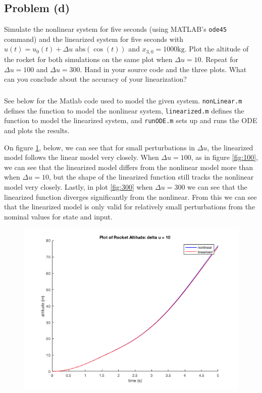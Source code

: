 \documentclass[11pt]{article}
\begin{document}
\subsection*{Problem (d)}
Simulate the nonlinear system for five seconds (using MATLAB's \texttt{ode45} command) and the linearized system for five seconds with $u(t)=u_0(t)+\Delta u\text{ abs}(\cos(t))$ and $x_{3,0}=1000\text{kg}$. Plot the altitude of the rocket for both simulations on the same plot when $\Delta u=10$. Repeat for $\Delta u=100$ and $\Delta u=300$. Hand in your source code and the three plots. What can you conclude about the accuracy of your linearization?

\subparagraph*{}
See below for the Matlab code used to model the given system. \texttt{nonLinear.m} defines the function to model the nonlinear system, \texttt{linearized.m} defines the function to model the linearized system, and \texttt{runODE.m} sets up and runs the ODE and plots the results.





On figure \ref{fig:10}, below, we can see that for small perturbations in $\Delta u$, the linearized model follows the linear model very closely. When $\Delta u=100$, as in figure \ref{fig:100}, we can see that the linearized model differs from the nonlinear model more than when $\Delta u = 10$, but the shape of the linearized function still tracks the nonlinear model very closely. Lastly, in plot \ref{fig:300} when $\Delta u=300$ we can see that the linearized function diverges significantly from the nonlinear. From this we can see that the linearized model is only valid for relatively small perturbations from the nominal values for state and input.

\begin{figure}[h!]
	\centering
	\includegraphics[width=0.6\linewidth]{plot10.png}
	\caption{}
	\label{fig:10}
\end{figure}
\end{document}
